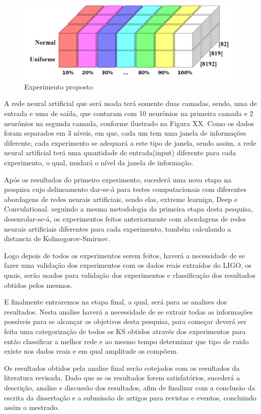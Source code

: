 \begin{figure}[ht]
\centering
\includegraphics[width=1\textwidth]{figuras/experimento.png}
\caption{Experimento proposto}
\label{figexperimento}
\end{figure}

A rede neural artificial que será usada terá somente duas camadas, sendo, uma de entrada e uma de saída, que contaram com 10 neurônios na primeira camada e 2 neurônios na segunda camada, conforme ilustrado na Figura XX. Como os dados foram separados em 3 níveis, em que, cada um tem uma janela de informações diferente, cada experimento se adequará a este tipo de janela, sendo assim, a rede neural artificial terá uma quantidade de entrada(input) diferente para cada experimento, o qual, mudará o nível da janela de informação.

Após os resultados do primeiro experimento, sucederá uma nova etapa na pesquisa cujo delineamento dar-se-á para testes computacionais com diferentes abordagens de redes neurais artificiais, sendo elas, extreme learnign, Deep e Convulational. seguindo a mesma metodologia da primeira etapa desta pesquisa, desenrolar-se-á, os experimentos feitos anteriormente com abordagens de redes neurais artificiais diferentes para cada experimento, também calculando a distancia de Kolmogorov-Smirnov.

Logo depois de todos os experimentos serem feitos, haverá a necessidade de se fazer uma validação dos experimentos com os dados reais extraídos do LIGO, os quais, serão usados para validação dos experimentos e classificação dos resultados obtidos pelos mesmos.

E finalmente entraremos na etapa final, a qual, será para as analises dos resultados. Nesta analise haverá a necessidade de  se extrair todas as informações possíveis para se alcançar os objetivos desta pesquisa, para começar deverá ser feita uma categorização de todos os KS obtidos através dos experimentos para então classificar a melhor rede e ao mesmo tempo determinar que tipo de ruido existe nos dados reais e em qual amplitude os compõem.

Os resultados obtidos pela analise final serão cotejados com os resultados da literatura revisada. Dado que se os resultados forem satisfatórios, sucederá a descrição, analise e discussão dos resultados, afim de finalizar com a conclusão da escrita da dissertação e a submissão de artigos para revistas e eventos, concluindo assim o mestrado.